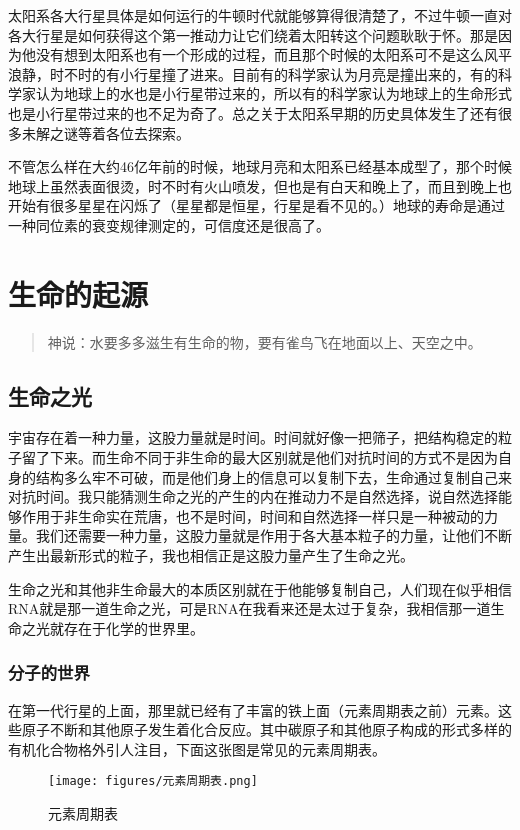 \documentclass[11pt,oneside]{article}
\begin{document}
太阳系各大行星具体是如何运行的牛顿时代就能够算得很清楚了，不过牛顿一直对各大行星是如何获得这个第一推动力让它们绕着太阳转这个问题耿耿于怀。那是因为他没有想到太阳系也有一个形成的过程，而且那个时候的太阳系可不是这么风平浪静，时不时的有小行星撞了进来。目前有的科学家认为月亮是撞出来的，有的科学家认为地球上的水也是小行星带过来的，所以有的科学家认为地球上的生命形式也是小行星带过来的也不足为奇了。总之关于太阳系早期的历史具体发生了还有很多未解之谜等着各位去探索。

不管怎么样在大约46亿年前的时候，地球月亮和太阳系已经基本成型了，那个时候地球上虽然表面很烫，时不时有火山喷发，但也是有白天和晚上了，而且到晚上也开始有很多星星在闪烁了（星星都是恒星，行星是看不见的。）地球的寿命是通过一种同位素的衰变规律测定的，可信度还是很高了。


\section{生命的起源}
\label{sec-5}
\begin{quote}
神说：水要多多滋生有生命的物，要有雀鸟飞在地面以上、天空之中。  
\end{quote}


\subsection{生命之光}
\label{sec-5-1}
宇宙存在着一种力量，这股力量就是时间。时间就好像一把筛子，把结构稳定的粒子留了下来。而生命不同于非生命的最大区别就是他们对抗时间的方式不是因为自身的结构多么牢不可破，而是他们身上的信息可以复制下去，生命通过复制自己来对抗时间。我只能猜测生命之光的产生的内在推动力不是自然选择，说自然选择能够作用于非生命实在荒唐，也不是时间，时间和自然选择一样只是一种被动的力量。我们还需要一种力量，这股力量就是作用于各大基本粒子的力量，让他们不断产生出最新形式的粒子，我也相信正是这股力量产生了生命之光。

生命之光和其他非生命最大的本质区别就在于他能够复制自己，人们现在似乎相信RNA就是那一道生命之光，可是RNA在我看来还是太过于复杂，我相信那一道生命之光就存在于化学的世界里。

\subsubsection{分子的世界}
\label{sec-5-1-1}
在第一代行星的上面，那里就已经有了丰富的铁上面（元素周期表之前）元素。这些原子不断和其他原子发生着化合反应。其中碳原子和其他原子构成的形式多样的有机化合物格外引人注目，下面这张图是常见的元素周期表。

\begin{figure}[H]
\centering
\texttt{[image: figures/元素周期表.png]}
\caption{元素周期表}
\end{figure}
\end{document}
